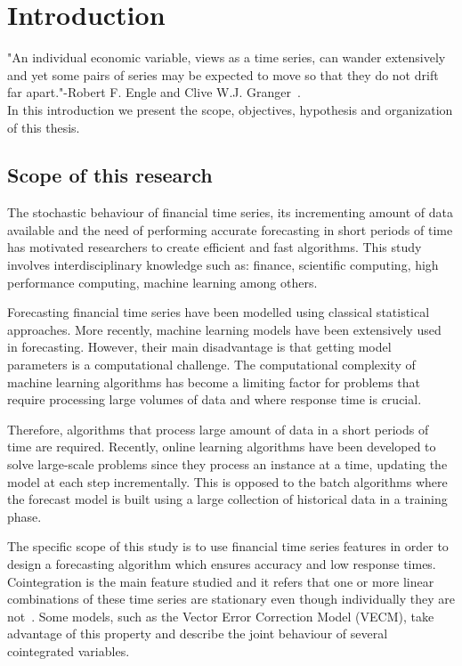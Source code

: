 \chapter{Introduction}\label{ch:introduction}

\vspace{0.5cm} 

"An individual economic variable, views as a time series, can wander extensively
and yet some pairs of series may be expected to move so that they do not drift
far apart."-Robert F. Engle and Clive W.J. Granger~\cite{engle1987}.\\
In this introduction we present the scope, objectives, hypothesis and
organization of this thesis.


\section{Scope of this research}

The stochastic behaviour of financial time series, its incrementing
amount of data available and the need of performing accurate forecasting in
short periods of time has motivated researchers to create efficient and fast
algorithms. This study involves interdisciplinary knowledge such as: finance,
scientific computing, high performance computing, machine learning
among others.

Forecasting financial time series have been modelled using classical statistical
approaches. More recently, machine learning models have been extensively used in
forecasting. However, their main disadvantage is that getting model parameters is a computational challenge.
The computational complexity of machine learning algorithms has become a
limiting factor for problems that require processing large volumes of data and
where response time is crucial.

Therefore, algorithms that process large amount of data in a short periods of
time are required. Recently, online learning algorithms have been developed to solve
large-scale problems since they process an instance at a time, updating the
model at each step incrementally. This is opposed to the batch algorithms where
the forecast model is built using a large collection of historical data in
a training phase.

The specific scope of this study is to use financial time series features in
order to design a forecasting algorithm which ensures accuracy and low response
times. Cointegration is the main feature studied and it refers that one or more
linear combinations of these time series are stationary even though individually
they are not~\cite{engle87}.  Some models, such as the Vector Error Correction Model
(VECM), take advantage of this property and describe the joint behaviour of
several cointegrated variables.

